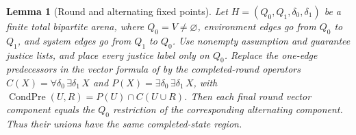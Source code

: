 \documentclass[11pt]{article}
\newtheorem{lemma}{Lemma}
\begin{document}
\begin{lemma}[Round and alternating fixed points]
\label{lem:round-alternating-fourfp}
Let $H=(Q_0,Q_1,\delta_0,\delta_1)$ be a finite total bipartite arena,
where $Q_0=V\ne\varnothing$, environment edges go from $Q_0$ to $Q_1$, and system
edges go from $Q_1$ to $Q_0$. Use nonempty assumption and guarantee
justice lists, and place every justice label only on $Q_0$.
Replace the one-edge predecessors in the vector formula of
\cite[Eq.~(15)]{friendly} by the completed-round operators
$C(X)=\forall\delta_0\,\exists\delta_1\,X$ and
$P(X)=\exists\delta_0\,\exists\delta_1\,X$, with
$\operatorname{CondPre}(U,R)=P(U)\cap C(U\cup R)$.
Then each final round vector component equals the $Q_0$ restriction
of the corresponding alternating component. Thus their unions have
the same completed-state region.
\end{lemma}
\end{document}
